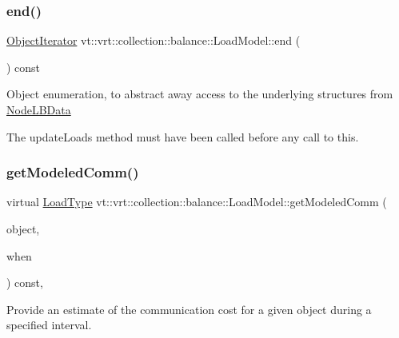 \subsubsection{\texorpdfstring{end()}{end()}}
{\footnotesize\ttfamily \hyperlink{structvt_1_1vrt_1_1collection_1_1balance_1_1_object_iterator}{Object\+Iterator} vt\+::vrt\+::collection\+::balance\+::\+Load\+Model\+::end (\begin{DoxyParamCaption}{ }\end{DoxyParamCaption}) const\hspace{0.3cm}{\ttfamily [inline]}}

Object enumeration, to abstract away access to the underlying structures from \hyperlink{structvt_1_1vrt_1_1collection_1_1balance_1_1_node_l_b_data}{Node\+L\+B\+Data}

The {\ttfamily update\+Loads} method must have been called before any call to this. \mbox{\label{structvt_1_1vrt_1_1collection_1_1balance_1_1_load_model_a47bd42bc5f25e43c62042caaa3fd05f7}} 
\subsubsection{\texorpdfstring{get\+Modeled\+Comm()}{getModeledComm()}}
{\footnotesize\ttfamily virtual \hyperlink{namespacevt_a8fb51741340b87d7aaee0bef60e9896b}{Load\+Type} vt\+::vrt\+::collection\+::balance\+::\+Load\+Model\+::get\+Modeled\+Comm (\begin{DoxyParamCaption}\item[{\hyperlink{namespacevt_1_1vrt_1_1collection_1_1balance_a9f5b53fafb270212279a4757d2c4cd28}{Element\+I\+D\+Struct}}]{object,  }\item[{\hyperlink{structvt_1_1vrt_1_1collection_1_1balance_1_1_phase_offset}{Phase\+Offset}}]{when }\end{DoxyParamCaption}) const\hspace{0.3cm}{\ttfamily [inline]}, {\ttfamily [virtual]}}



Provide an estimate of the communication cost for a given object during a specified interval. 


